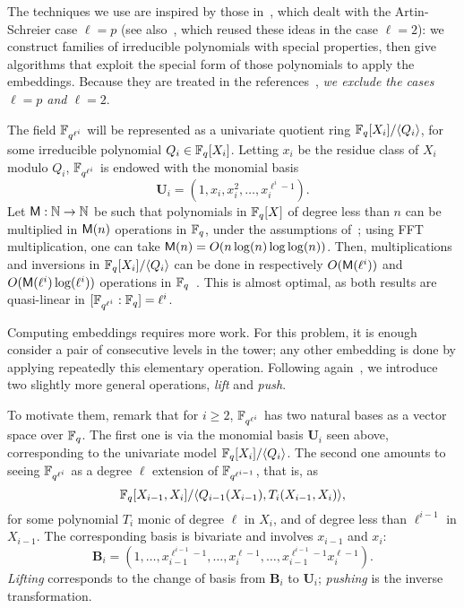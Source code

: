 \documentclass{sig-alternate}
\newcommand{\bb}{\mathbf{B}}
\newcommand{\uu}{\mathbf{U}}  %
\begin{document}

The techniques we use are inspired by those in~\cite{df+schost12},
which dealt with the Artin-Schreier case $\ell=p$ (see
also~\cite{DoSc12}, which reused these ideas in the case $\ell=2$): we
construct families of irreducible polynomials with special properties,
then give algorithms that exploit the special form of those
polynomials to apply the embeddings. Because they are treated in the
references~\cite{df+schost12,DoSc12}, {\em we exclude the cases $\ell=p$
and $\ell=2$}.

The field $\mathbb{F}_{q^{\ell^i}}$ will be represented as a univariate
quotient ring $\mathbb{F}_q[X_i]/\langle Q_i\rangle$, for some irreducible
polynomial $Q_i \in \mathbb{F}_q[X_i]$. Letting $x_i$ be the residue class of
$X_i$ modulo $Q_i$, $\mathbb{F}_{q^{\ell^i}}$ is endowed with the monomial
basis
\begin{equation}
  \label{eq:uni-basis1}
  \uu_i = (1,x_{i},x_{i}^2,\ldots,x_{i}^{\ell^{i}-1}).
\end{equation}
Let $\mathsf{M} : \mathbb{N} \rightarrow \mathbb{N}$ be such that polynomials in $\mathbb{F}_q[X]$
of degree less than $n$ can be multiplied in $\mathsf{M}(n)$ operations in
$\mathbb{F}_q$, under the assumptions of~\cite[Ch.~8.3]{vzGG}; using FFT
multiplication, one can take $\mathsf{M}(n)=O(n\log (n) \log\log
(n))$. Then, multiplications and inversions in $\mathbb{F}_q[X_i]/\langle Q_i
\rangle$ can be done in respectively $O(\mathsf{M}(\ell^i))$ and
$O(\mathsf{M}(\ell^i)\log(\ell^i))$ operations in
$\mathbb{F}_q$~\cite[Ch.~9-11]{vzGG}. This is almost optimal, as both results
are quasi-linear in $[\mathbb{F}_{q^{\ell^i}}:\mathbb{F}_q]=\ell^i$.

Computing embeddings requires more work. For this problem, it is
enough consider a pair of consecutive levels in the tower; any other
embedding is done by applying repeatedly this elementary
operation. Following again~\cite{df+schost12}, we introduce two
slightly more general operations, {\em lift} and {\em push}.

To motivate them, remark that for $i \ge 2$, $\mathbb{F}_{q^{\ell^{i}}}$ has
two natural bases as a vector space over $\mathbb{F}_q$. The first one is via
the monomial basis $\uu_{i}$ seen above, corresponding to the
univariate model $\mathbb{F}_q[X_{i}]/ \langle Q_{i} \rangle$. The second one
amounts to seeing $\mathbb{F}_{q^{\ell^{i}}}$ as a degree $\ell$ extension of
$\mathbb{F}_{q^{\ell^{i-1}}}$, that is, as
\begin{equation}\label{eq:QiTi}
\mathbb{F}_q[X_{i-1},X_i]/\langle Q_{i-1}(X_{i-1}), T_i(X_{i-1},X_i)\rangle,  
\end{equation}
for some polynomial $T_i$ monic of degree $\ell$ in $X_{i}$, and of
degree less than $\ell^{i-1}$ in $X_{i-1}$.  The corresponding basis is
bivariate and involves $x_{i-1}$ and $x_i$:
\begin{equation}
  \label{eq:bi-basis}
  \bb_{i} = (1,\ldots,x_{i-1}^{\ell^{i-1}-1},\ldots,x_i^{\ell-1},\ldots,x_{i-1}^{\ell^{i-1}-1}x_i^{\ell-1}).
\end{equation}
{\em Lifting} corresponds to the change of basis from $\bb_i$ to
$\uu_i$; {\em pushing} is the inverse transformation.
\end{document}
